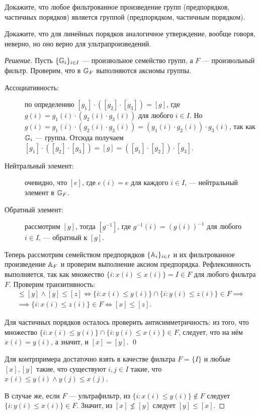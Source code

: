     \begin{problem}[2]
        Докажите, что любое фильтрованное произведение групп (предпорядков, частичных порядков) является группой (предпорядком, частичным порядком).

        Докажите, что для линейных порядков аналогичное утверждение, вообще говоря, неверно, но оно верно для ультрапроизведений.
    \end{problem}
    \begin{proof}[Решение]
        Пусть \(\{\mathbb{G}_i\}_{i \in I}\) --- произвольное семейство групп, а \(F\) --- произвольный фильтр. Проверим, что в \(\mathbb{G}_F\) выполняются аксиомы группы.
        \begin{description}
            \item[Ассоциативность:] по определению \([g_1] \cdot ([g_2] \cdot [g_3]) = [g]\), где \(g(i) = g_1(i) \cdot (g_2(i) \cdot g_3(i))\) для любого \(i \in I\). Но \(g(i) = g_1(i) \cdot (g_2(i) \cdot g_3(i)) = (g_1(i) \cdot g_2(i)) \cdot g_3(i)\), так как \(\mathbb{G}_i\) --- группа. Отсюда получаем \([g_1] \cdot ([g_2] \cdot [g_3]) = [g] = ([g_1] \cdot [g_2]) \cdot [g_3]\).
            \item[Нейтральный элемент:] очевидно, что \([e]\), где \(e(i) = e\) для каждого \(i \in I\), --- нейтральный элемент в \(\mathbb{G}_F\).
            \item[Обратный элемент:] рассмотрим \([g]\), тогда \([g^{-1}]\), где \(g^{-1}(i) = (g(i))^{-1}\) для любого \(i \in I\), --- обратный к \([g]\). 
        \end{description}

        Теперь рассмотрим семейством предпорядков \(\{\mathbb{A}_i\}_{i \in I}\) и их фильтрованное произведение \(\mathbb{A}_F\) и проверим выполнение аксиом предпорядка. Рефлексивность выполняется, так как множество \(\{i : x(i) \leqslant x(i)\} = I \in F\) для любого фильтра \(F\). Проверим транзитивность:
        \begin{multline*}
            [x] \leqslant [y] \land [y] \leqslant [z] \iff \{i : x(i) \leqslant y(i)\} \cap \{i : y(i) \leqslant z(i)\} \in F \implies \\
            \implies \{i : x(i) \leqslant z(i)\} \in F \iff [x] \leqslant [z].
        \end{multline*}

        Для частичных порядков осталось проверить антисимметричность: из того, что множество \(\{i : x(i) \leqslant y(i)\} \cap \{i : y(i) \leqslant x(i)\} \in F\), следует, что на нём \(x(i) = y(i)\), а значит, и \([x] = [y]\). \qed

        Для контрпримера достаточно взять в качестве фильтра \(F = \{I\}\) и любые \([x], [y]\) такие, что существуют \(i, j \in I\) такие, что \(x(i) \leqslant y(i) \land y(j) \leqslant x(j)\).
        
        В случае же, если \(F\) --- ультрафильтр, из \(\{i : x(i) \leqslant y(i)\} \not \in F\) следует \(\{i : y(i) \leqslant x(i)\} \in F\). Значит, из \([x] \not\leqslant [y]\) следует \([y] \leqslant [x]\).
    \end{proof}
    

